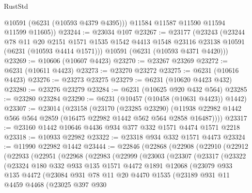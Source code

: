 \begin{lexlean}{RustStd}
\begin{coremodule}
{{          @10591
          (@6231 (@10593 @4379 @4395)))
        @11584
        @11587
        @11590
        @11594
        @11599
        @11605))
@23244 := @23034 @107
@23267 := @23177
    (@23243
      (@23244
        @78
        @11
        @20
        @2151
        @1571
        @1535
        @1542
        @4413
        @1548
        @23116
        @23138
        @10591
        (@6231 (@10593 @4414 @1571)))
      @10591
      (@6231 (@10593 @4371 @4420)))
@23269 := @10606 (@10607 @4423)
@23270 := @23267 @23269
@23272 := @6231 (@10611 @4423)
@23273 := @23270 @23272
@23275 := @6231 (@10616 @4423)
@23276 := @23273 @23275
@23279 := @6231 (@10620 @4423 @432)
@23280 := @23276 @23279
@23284 := @6231 (@10625 @920 @432 @564)
@23285 := @23280 @23284
@23290 := @6231 (@10457 (@10458 (@10631 @4423)) @1442)
@23307 := @23014
    (@23158
      (@23170
        (@23285 @23290)
        (@11938 @22982 @1442 @566 @564 @2859 (@16475 @22982 @1442 @562 @564 @2858 @16487))))
@23317 := @23160 @1442 @10646 @4436 @934 @377 @332 @1571 @4474 @1571 @2218
@23318 := @10933 @22982
@23322 := @23318 @934 @332 @1571 @4473
@23324 := @11990 @22982 @1442
@23444 := @22846
    (@22868
      (@22908
        (@22910
          (@22912
            (@22933
              (@22951
                (@22968
                  (@22983
                    (@22999
                      (@23003
                        (@23307
                          (@23317
                            (@23322
                              (@23324
                                @180
                                @332
                                @933
                                @135
                                @1571
                                @4472
                                @1891
                                @12068
                                (@23079
                                  @933
                                  @135
                                  @4472
                                  (@23084
                                    @931
                                    @78
                                    @11
                                    @20
                                    @4470
                                    @1535
                                    (@23189
                                      @931
                                      @11
                                      @4459
                                      @4468
                                      (@23025
                                        @397
                                        @930
}}
\end{coremodule}
\end{lexlean}
